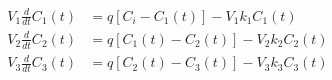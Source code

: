 \begin{equation}
  \begin{aligned}
    V_1 \frac{d}{dt}C_1(t) & = q [C_i - C_1(t)] - V_1 k_1 C_1(t)
    \\
    V_2 \frac{d}{dt}C_2(t) & = q [C_1(t) - C_2(t)] - V_2 k_2 C_2(t)
    \\
    V_3 \frac{d}{dt}C_3(t) & = q [C_2(t) - C_3(t)] - V_3 k_3 C_3(t)
  \end{aligned}
  \label{eq:three_stirred_tank01_1}
\end{equation}